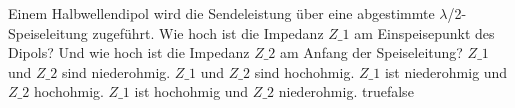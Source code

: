     {Einem Halbwellendipol wird die Sendeleistung über eine abgestimmte $\lambda$/2-Speiseleitung zugeführt. Wie hoch ist die Impedanz $Z\_1$ am Einspeisepunkt des Dipols? Und wie hoch ist die Impedanz $Z\_2$ am Anfang der Speiseleitung?}
    {$Z\_1$ und $Z\_2$ sind niederohmig.}
    {$Z\_1$ und $Z\_2$ sind hochohmig.}
    {$Z\_1$ ist niederohmig und $Z\_2$ hochohmig.}
    {$Z\_1$ ist hochohmig und $Z\_2$ niederohmig.}
    {true}{false}